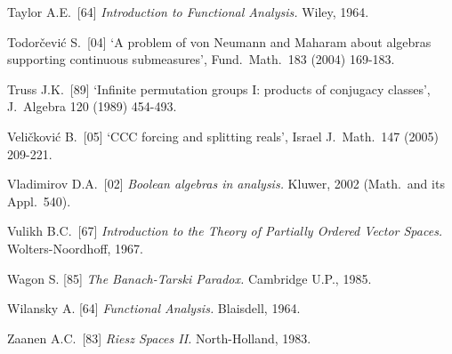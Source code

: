 {Taylor A.E.\ [64] {\it Introduction to Functional Analysis.}
Wiley, 1964.
\cmmnt{[\S3A5.]}

Todor\v{c}evi\'c S.\ [04]
`A problem of von Neumann and Maharam about algebras supporting
continuous submeasures',
Fund.\ Math.\ 183 (2004) 169-183.
\cmmnt{[393S.]}

Truss J.K.\ [89] `Infinite permutation groups I:  products of conjugacy
classes',
J.\ Algebra 120 (1989) 454-493.
\cmmnt{[\S382 {\it notes\/}.]}

\medskip %

Veli\v{c}kovi\'c B.\ [05] `CCC forcing and splitting reals',
Israel J.\ Math.\ 147 (2005) 209-221.

Vladimirov D.A.\ [02] {\it Boolean algebras in analysis.}
Kluwer, 2002 (Math.\ and its Appl.\ 540).
\cmmnt{[367L.]}

Vulikh B.C.\ [67] {\it Introduction to the Theory of Partially Ordered
Vector Spaces.}   Wolters-Noordhoff, 1967.
\cmmnt{[\S364 {\it notes\/}.]}

\medskip %

Wagon S. [85] {\it The Banach-Tarski Paradox.}   Cambridge U.P., 1985.
\cmmnt{[\S395 {\it notes\/}.]}

Wilansky A. [64] {\it Functional Analysis.}  Blaisdell, 1964.
\cmmnt{[\S3A5.]}

\medskip %

Zaanen A.C.\ [83] {\it Riesz Spaces II.}  North-Holland, 1983.


\frnewpage

}%

